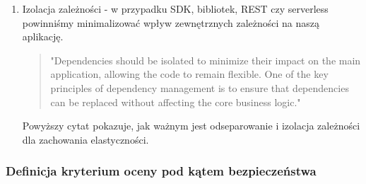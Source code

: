 \documentclass[runningheads,12pt]{llncs}
\begin{document}
\begin{enumerate}
    \item Izolacja zależności - w przypadku SDK, bibliotek, REST czy serverless powinniśmy minimalizować wpływ zewnętrznych zależności na naszą aplikację.
    \begin{quote}
        "Dependencies should be isolated to minimize their impact on the main application, allowing the code to remain flexible. One of the key principles of dependency management is to ensure that dependencies can be replaced without affecting the core business logic." ~\cite[p. 218]{martin2008clean}
    \end{quote}
    Powyższy cytat pokazuje, jak ważnym jest odseparowanie i izolacja zależności dla zachowania elastyczności.
\end{enumerate}

\subsubsection{Definicja kryterium oceny pod kątem bezpieczeństwa}
\end{document}
